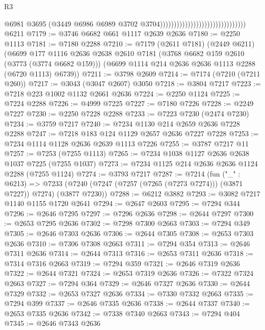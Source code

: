 \begin{lexlean}{R3}
\begin{coremodule}
                                                                @6981
                                                                @3695
                                                                (@3449
                                                                  @6986
                                                                  @6989
                                                                  @3702
                                                                  @3704)))))))))))))))))))))))))))))))
    @6211
@7179 := @3746 @6682 @661 @1117 @2639 @2636
@7180 := @2250 @1113
@7181 := @7180 @2288
@7210 := @7179
    (@2611 @7181)
    (@2449 @6211)
    (@6699
      @177
      @1116
      @2636
      @2638
      @2610
      @7181
      (@3768 @6682 @159 @2610 (@3773 (@3774 @6682 @159)))
      (@6699 @1114 @214 @2636 @2636 @1113 @2288 (@6720 @1113) @6739))
@7211 := @3798 @2609
@7214 := @7174 (@7210 (@7211 @260))
@7217 := @3043 (@3047 @2607) @3050
@7218 := @3804 @7217
@7223 := @7218 @223 @1002 @1132 @2661 @2636
@7224 := @2250 @1124
@7225 := @7224 @2288
@7226 := @4999 @7225
@7227 := @7180 @7226
@7228 := @2249 @7227
@7230 := @2250 @7228 @2288
@7233 := @7223 @7230 (@2474 @7230)
@7234 := @3759 @7217
@7240 := @7234 @1130 @214 @2659 @2636 @7228 @2288
@7247 := @7218 @183 @124 @1129 @2657 @2636 @7227 @7228
@7253 := @7234 @1114 @1128 @2636 @2639 @1113 @7226
@7255 := @3787 @7217 @11
@7257 := @7253 (@7255 @1113)
@7265 := @7234 @1038 @1127 @2636 @2638 @1037 @7225 (@7255 @1037)
@7273 := @7234 @1125 @214 @2636 @2636 @1124 @2288 (@7255 @1124)
@7274 := @3793 @7217
@7287 := @7214
    (fun ("_" : @6213) =>
    @7233 (@7240 (@7247 (@7257 (@7265 (@7273 @7274))) (@3871 @7227)) @7274) (@3877 @7230))
@7288 := @6212 @3882
@7293 := @3082 @7217 @1140 @1155 @1720 @2641
@7294 := @2647 @2603
@7295 := @7294 @344
@7296 := @2646 @7295
@7297 := @7296 @2636
@7298 := @2644 @7297
@7300 := @2653 @7295 @2636
@7302 := @7298 @7300 @2663
@7303 := @7294 @349
@7305 := @2646 @7303 @2636
@7306 := @2644 @7305
@7308 := @2653 @7303 @2636
@7310 := @7306 @7308 @2663
@7311 := @7294 @354
@7313 := @2646 @7311 @2636
@7314 := @2644 @7313
@7316 := @2653 @7311 @2636
@7318 := @7314 @7316 @2663
@7319 := @7294 @359
@7321 := @2646 @7319 @2636
@7322 := @2644 @7321
@7324 := @2653 @7319 @2636
@7326 := @7322 @7324 @2663
@7327 := @7294 @364
@7329 := @2646 @7327 @2636
@7330 := @2644 @7329
@7332 := @2653 @7327 @2636
@7334 := @7330 @7332 @2663
@7335 := @7294 @399
@7337 := @2646 @7335 @2636
@7338 := @2644 @7337
@7340 := @2653 @7335 @2636
@7342 := @7338 @7340 @2663
@7343 := @7294 @404
@7345 := @2646 @7343 @2636

\end{coremodule}
\end{lexlean}
